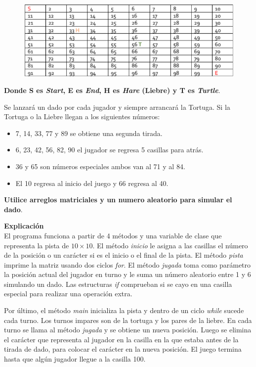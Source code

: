 \documentclass[11pt, twocolumn]{article}
\begin{document}
  \begin{figure}[ht]
    \includegraphics[width=\columnwidth, center]{Pista.png}
  \end{figure}

  \textbf{Donde S es \textit{Start}, E es \textit{End}, H es \textit{Hare} (Liebre) y T es \textit{Turtle}}.

  Se lanzará un dado por cada jugador y siempre arrancará la Tortuga. Si la Tortuga o la Liebre llegan a los siguientes números:

  \begin{itemize}
    \item 7, 14, 33, 77 y 89 se obtiene una segunda tirada.
    \item 6, 23, 42, 56, 82, 90 el jugador se regresa 5 casillas para atrás.
    \item 36 y 65 son números especiales ambos van al 71 y al 84.
    \item El 10 regresa al inicio del juego y 66 regresa al 40.
  \end{itemize}

  \textbf{Utilice arreglos matriciales y un numero aleatorio para simular el dado}.

  \textbf{Explicación} \\
  El programa funciona a partir de 4 métodos y una variable de clase que representa la pista de $10\times 10$. El método \textit{inicio} le asigna a las casillas el número de la posición o un carácter si es el inicio o el final de la pista. El método \textit{pista} imprime la matriz usando dos ciclos \textit{for}. El método \textit{jugada} toma como parámetro la posición actual del jugador en turno y le suma un número aleatorio entre 1 y 6 simulando un dado. Las estructuras \textit{if} comprueban si se cayo en una casilla especial para realizar una operación extra.

  Por último, el método \textit{main} inicializa la pista y dentro de un ciclo \textit{while} sucede cada turno. Los turnos impares son de la tortuga y los pares de la liebre. En cada turno se llama al método \textit{jugada} y se obtiene un nueva posición. Luego se elimina el carácter que representa al jugador en la casilla en la que estaba antes de la tirada de dado, para colocar el carácter en la nueva posición. El juego termina hasta que algún jugador llegue a la casilla 100. 
\end{document}
